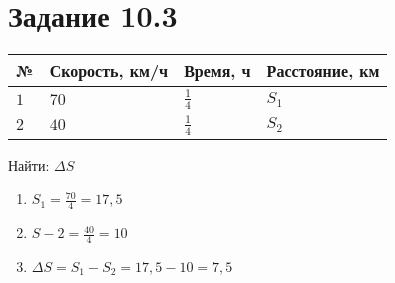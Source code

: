 \section*{Задание 10.3}


\begin{tabular}{|l|l|l|l|}
\hline
№   & Скорость, км/ч & Время, ч & Расстояние, км \\ \hline
$1$ & $70$           & $\frac{1}{4}$   & $S_1$ \\ \hline
$2$ & $40$           & $\frac{1}{4}$   & $S_2$ \\ \hline
\end{tabular}

Найти: $\Delta S$

\begin{enumerate}
    \item  $S_1 = \frac{70}{4}=17,5$
    \item  $S-2 = \frac{40}{4} = 10$
    \item  $\Delta S = S_1 - S_2 = 17,5 - 10 = 7,5$
\end{enumerate}

